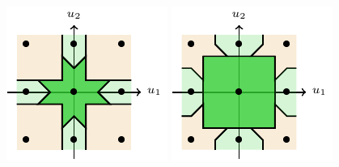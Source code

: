 \documentclass[11pt]{article}
\begin{document}
\begin{figure}
	\begin{center}
		\begin{minipage}{0.48\linewidth}
			\includegraphics[width=\linewidth]{tikz/lovasz-link-psi-star.pdf}
		\end{minipage}\hfill
		\begin{minipage}{0.48\linewidth}
			\includegraphics[width=\linewidth]{tikz/lovasz-link-psi-diamond.pdf}

\end{minipage}
\end{center}
\end{figure}
\end{document}

